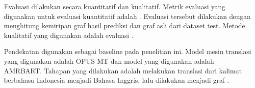 Evaluasi dilakukan secara kuantitatif dan kualitatif.
Metrik evaluasi yang digunakan untuk evaluasi kuantitatif adalah \SMATCH{}.
Evaluasi tersebut dilakukan dengan menghitung kemiripan graf \AMR{} hasil prediksi dan graf \AMR{} asli dari dataset test.
Metode kualitatif yang digunakan adalah evaluasi \transdiver{}.

Pendekatan   digunakan sebagai baseline pada penelitian ini.
Model mesin translasi yang digunakan adalah {OPUS-MT} dan model \amrparsing{} yang digunakan adalah \gls{AMRBART}.
Tahapan yang dilakukan adalah melakukan translasi dari kalimat berbahasa Indonesia menjadi Bahasa Inggris, lalu dilakukan \amrparsing{} menjadi graf \AMR{}.
